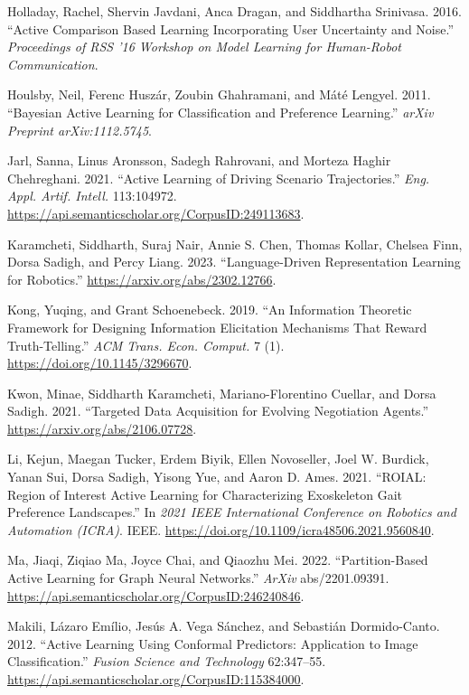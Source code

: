 \documentclass[
  letterpaper,
  numbers=noenddot,
  DIV=11]{scrreprt}
\newlength{\cslhangindent}
\newenvironment{CSLReferences}[2] %
 {\begin{list}{}{%
  \setlength{\itemindent}{0pt}
  \setlength{\leftmargin}{0pt}
  \setlength{\parsep}{0pt}
  \ifodd #1
   \setlength{\leftmargin}{\cslhangindent}
   \setlength{\itemindent}{-1\cslhangindent}
  \fi
  \setlength{\itemsep}{#2\baselineskip}}}
 {\end{list}}
\theoremstyle{plain}
\theoremstyle{definition}
\theoremstyle{plain}
\theoremstyle{remark}
\begin{document}
\begin{CSLReferences}{1}{0}
Holladay, Rachel, Shervin Javdani, Anca Dragan, and Siddhartha
Srinivasa. 2016. {``Active Comparison Based Learning Incorporating User
Uncertainty and Noise.''} \emph{Proceedings of RSS '16 Workshop on Model
Learning for Human-Robot Communication}.

Houlsby, Neil, Ferenc Huszár, Zoubin Ghahramani, and Máté Lengyel. 2011.
{``Bayesian Active Learning for Classification and Preference
Learning.''} \emph{arXiv Preprint arXiv:1112.5745}.

Jarl, Sanna, Linus Aronsson, Sadegh Rahrovani, and Morteza Haghir
Chehreghani. 2021. {``Active Learning of Driving Scenario
Trajectories.''} \emph{Eng. Appl. Artif. Intell.} 113:104972.
\url{https://api.semanticscholar.org/CorpusID:249113683}.

Karamcheti, Siddharth, Suraj Nair, Annie S. Chen, Thomas Kollar, Chelsea
Finn, Dorsa Sadigh, and Percy Liang. 2023. {``Language-Driven
Representation Learning for Robotics.''}
\url{https://arxiv.org/abs/2302.12766}.

Kong, Yuqing, and Grant Schoenebeck. 2019. {``An Information Theoretic
Framework for Designing Information Elicitation Mechanisms That Reward
Truth-Telling.''} \emph{ACM Trans. Econ. Comput.} 7 (1).
\url{https://doi.org/10.1145/3296670}.

Kwon, Minae, Siddharth Karamcheti, Mariano-Florentino Cuellar, and Dorsa
Sadigh. 2021. {``Targeted Data Acquisition for Evolving Negotiation
Agents.''} \url{https://arxiv.org/abs/2106.07728}.

Li, Kejun, Maegan Tucker, Erdem Biyik, Ellen Novoseller, Joel W.
Burdick, Yanan Sui, Dorsa Sadigh, Yisong Yue, and Aaron D. Ames. 2021.
{``ROIAL: Region of Interest Active Learning for Characterizing
Exoskeleton Gait Preference Landscapes.''} In \emph{2021 IEEE
International Conference on Robotics and Automation (ICRA)}. IEEE.
\url{https://doi.org/10.1109/icra48506.2021.9560840}.

Ma, Jiaqi, Ziqiao Ma, Joyce Chai, and Qiaozhu Mei. 2022.
{``Partition-Based Active Learning for Graph Neural Networks.''}
\emph{ArXiv} abs/2201.09391.
\url{https://api.semanticscholar.org/CorpusID:246240846}.

Makili, Lázaro Emílio, Jesús A. Vega Sánchez, and Sebastián
Dormido-Canto. 2012. {``Active Learning Using Conformal Predictors:
Application to Image Classification.''} \emph{Fusion Science and
Technology} 62:347--55.
\url{https://api.semanticscholar.org/CorpusID:115384000}.


\end{CSLReferences}
\end{document}
